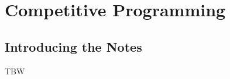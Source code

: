 \documentclass[../../main.tex]{subfiles}
\begin{document}
\part{Competitive Programming}\label{part:CS02}
\localtableofcontents

\chapter*{Introducing the Notes}

TBW













\end{document}
